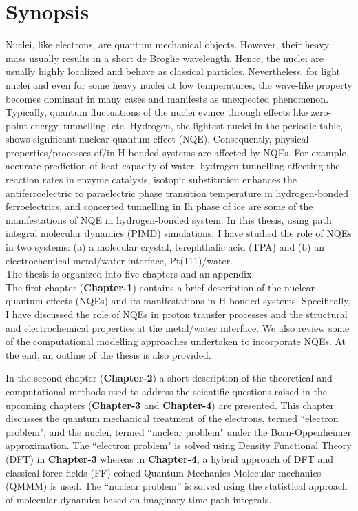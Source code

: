 \chapter{Synopsis}

\noindent Nuclei, like electrons, are quantum mechanical objects. However, their heavy mass usually results in a short de Broglie wavelength. Hence, the nuclei are usually highly localized and behave as classical particles. Nevertheless, for light nuclei and even for some heavy nuclei at low temperatures, the wave-like property becomes dominant in many cases and manifests as unexpected phenomenon. Typically, quantum fluctuations of the nuclei evince through effects like zero-point energy, tunnelling, etc. Hydrogen, the lightest nuclei in the periodic table, shows significant nuclear quantum effect (NQE). Consequently, physical properties/processes of/in H-bonded systems are affected by NQEs. For example, accurate prediction of heat capacity of water, hydrogen tunnelling affecting the reaction rates in enzyme catalysis, isotopic substitution enhances the antiferroelectric to paraelectric phase transition temperature in hydrogen-bonded ferroelectrics, and concerted tunnelling in Ih phase of ice are some of the manifestations of NQE in hydrogen-bonded system. In this thesis, using path integral molecular dynamics (PIMD) simulations, I have studied the role of NQEs in two systems: (a) a molecular crystal, terephthalic acid (TPA) and (b) an electrochemical metal/water interface, Pt(111)/water.
\\

\noindent The thesis is organized into five chapters and an appendix. 
\\

\noindent The first chapter (\textbf{Chapter-1}) contains a brief description of the nuclear quantum effects (NQEs) and its manifestations in H-bonded systems. Specifically, I have discussed the role of NQEs in proton transfer processes and the structural and electrochemical properties at the metal/water interface. We also review some of the computational modelling approaches undertaken to incorporate NQEs. At the end, an outline of the thesis is also provided. 

\noindent In the second chapter (\textbf{Chapter-2}) a short description of the theoretical and computational methods used to address the scientific questions raised in the upcoming chapters (\textbf{Chapter-3} and \textbf{Chapter-4}) are presented. This chapter discusses the quantum  mechanical treatment of the electrons, termed ``electron problem", and the nuclei, termed ``nuclear problem" under the Born-Oppenheimer approximation. The ``electron problem" is solved using Density Functional Theory (DFT) in \textbf{Chapter-3} whereas in \textbf{Chapter-4}, a hybrid approach of DFT and classical force-fields (FF) coined Quantum Mechanics Molecular mechanics (QMMM) is used. The ``nuclear problem'' is solved using the statistical approach of molecular dynamics based on imaginary time path integrals. 

